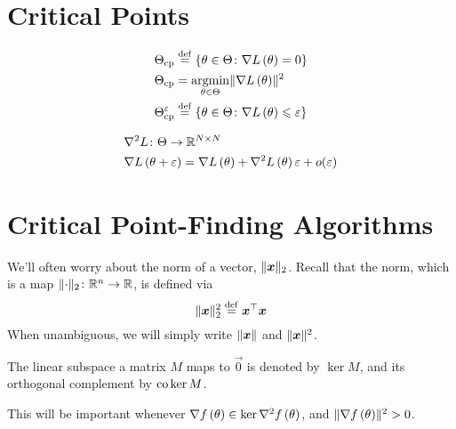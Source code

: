 \documentclass[../../thesis.tex]{subfiles}
\begin{document}
\section{Critical Points}

\begin{align}
	\Theta_{\textrm{cp}} &\stackrel{\small \mathrm{def}}{=} \left\{\theta \in \Theta \colon \nabla L\left(\theta\right) = 0\right\}\\
	\Theta_{\textrm{cp}} &= \mathop{\mathrm{argmin}}_{\theta \in \Theta} \lVert\nabla L\left(\theta\right)\rVert^2\\
	\Theta^\varepsilon_{\textrm{cp}} &\stackrel{\small \mathrm{def}}{=} \left\{\theta \in \Theta \colon \nabla L\left(\theta\right) \leqslant \varepsilon\right\}\\
\end{align}

\begin{align}
	&\nabla^2{L}\colon \Theta \to \mathbb{R}^{N\times N}\\
	&\nabla L\left(\theta + \varepsilon\right) = \nabla L\left(\theta\right) + \nabla^2L\left(\theta\right)\varepsilon + o(\varepsilon)
\end{align}

\section{Critical Point-Finding Algorithms}
We'll often worry about the norm of a vector,
$\lVert{\bm{x}}\rVert_{\scriptstyle2}$.
Recall that the norm, which is a map
$\lVert\cdot\rVert_{\scriptstyle2} \colon \mathbb{R}^n \to \mathbb{R}$,
is defined via
\[
	\lVert{\bm{x}}\rVert_{\scriptstyle2}^2 \stackrel{\small \mathrm{def}}{=} {{\bm{x}}^\top}{\bm{x}}
\]
When unambiguous, we will simply write $\lVert{\bm{x}}\rVert$
and $\lVert{\bm{x}}\rVert^2$.

The linear subspace a matrix $M$ maps to $\vec{0}$
is denoted by $\ker{M}$,
and its orthogonal complement by $\operatorname*{co}{\ker{M}}$.

This will be important whenever
$\nabla f\left(\theta\right) \in \ker\nabla^2f\left(\theta\right)$,
and
$\lVert\nabla f\left(\theta\right)\rVert^2 > 0$.

\onlyinsubfile{\printbibliography}
\end{document}

